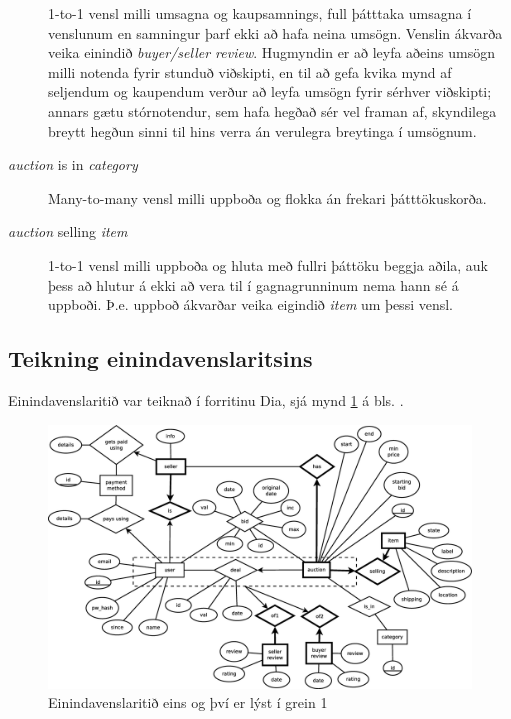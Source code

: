 \documentclass[a4paper,icelandic]{article}
\theoremstyle{definition} \newtheorem{skilgr}{Skilgreining}
\theoremstyle{plain}      \newtheorem{setn}{Setning}
\theoremstyle{remark}     \newtheorem*{lausn}{Lausn}
\begin{document}
\begin{description}
        1-to-1 vensl milli umsagna og kaupsamnings, full þátttaka umsagna í
        venslunum en samningur þarf ekki að hafa neina umsögn. Venslin ákvarða
        veika einindið \emph{buyer/seller review}. Hugmyndin er að leyfa aðeins
        umsögn milli notenda fyrir stunduð viðskipti, en til að gefa kvika mynd
        af seljendum og kaupendum verður að leyfa umsögn fyrir sérhver
        viðskipti; annars gætu stórnotendur, sem hafa hegðað sér vel framan af,
        skyndilega breytt hegðun sinni til hins verra án verulegra breytinga í
        umsögnum.
    \item[\emph{auction} is in \emph{category}] Many-to-many vensl milli uppboða
        og flokka án frekari þátttökuskorða.
    \item[\emph{auction} selling \emph{item}] 1-to-1 vensl milli uppboða og
        hluta með fullri þáttöku beggja aðila, auk þess að hlutur á ekki að vera
        til í gagnagrunninum nema hann sé á uppboði. Þ.e. uppboð ákvarðar veika
        eigindið \emph{item} um þessi vensl.
\end{description}

\subsection{Teikning einindavenslaritsins}

Einindavenslaritið var teiknað í forritinu Dia, sjá mynd \ref{fig:erd} á bls.
\pageref{fig:erd}.

\begin{figure}[h]
    \begin{center}
        \includegraphics[width=0.96\textheight,angle=-90]{schema.eps}
    \end{center}
    \caption{Einindavenslaritið eins og því er lýst í grein 1}
    \label{fig:erd}
\end{figure}
\end{document}
